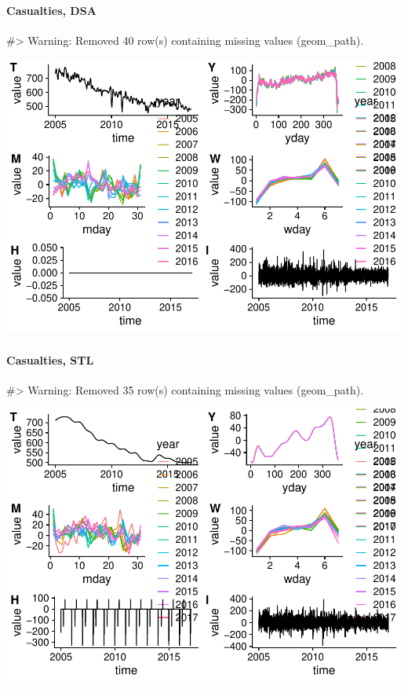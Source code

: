 \hypertarget{casualties-dsa}{%
\paragraph{Casualties, DSA}\label{casualties-dsa}}

\begin{Schunk}
\begin{Soutput}
#> Warning: Removed 40 row(s) containing missing values (geom_path).
\end{Soutput}

\includegraphics[width=1\linewidth]{overview_files/figure-latex/unnamed-chunk-6-1} \end{Schunk}

\hypertarget{casualties-stl}{%
\paragraph{Casualties, STL}\label{casualties-stl}}

\begin{Schunk}
\begin{Soutput}
#> Warning: Removed 35 row(s) containing missing values (geom_path).
\end{Soutput}

\includegraphics[width=1\linewidth]{overview_files/figure-latex/unnamed-chunk-7-1} \end{Schunk}

